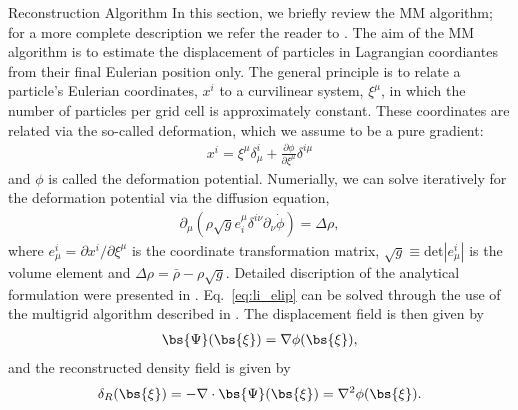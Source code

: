 \begin{section}{Reconstruction Algorithm}
  \label{sec:reconstruction}
  In this section, we briefly review the MM algorithm; for a more
  complete description we refer the reader to \cite{bib:ZhuH2016}.  
  The aim of the MM algorithm is to estimate the displacement of particles in 
  Lagrangian coordiantes from their final Eulerian position only. The
  general principle is to relate a particle's Eulerian coordinates, $x^i$ to
  a curvilinear system, $\xi^\mu$, in which the number of particles
  per grid cell is approximately constant.  These coordinates are
  related via the so-called deformation, which we assume to be a pure
  gradient:
  \begin{align}
    x^i = \xi^\mu \delta^i_\mu + \frac{\partial \phi}{\partial
    \xi^\mu}\delta^{i\mu}
  \end{align}
  and $\phi$ is called the deformation potential.  Numerially, we 
  can solve iteratively for
  the deformation potential via the diffusion equation, 
  \begin{align}
    \label{eq:li_elip}
    \partial _\mu (\rho \sqrt{g} e^\mu _i \delta^{i\nu}
    \partial_\nu \dot{\phi})=\Delta \rho,
  \end{align}
  where $e^i_\mu = \partial x^i / \partial \xi ^ \mu$ is the
  coordinate transformation matrix,
  $\sqrt{g} \equiv \mathrm{det}\left| e^i_\mu\right|$ is the volume
  element and $\Delta \rho = \bar{\rho}-\rho \sqrt{g}$. Detailed discription 
  of the analytical formulation were presented in \cite{bib:Pen1995,bib:Pen1998}.
  Eq.~\ref{eq:li_elip} can be solved through the use of the multigrid
  algorithm described in \cite{bib:Pen1995,bib:Pen1998,bib:ZhuH2016}.
  The displacement field is then given by
  \begin{align}
   \label{eq:disp}
   \bs{\Psi}(\bs{\xi})=\nabla \phi(\bs{\xi}),
  \end{align}
  and the reconstructed density field is given by
  \begin{align}
   \label{eq:delta}
   \delta_R(\bs{\xi})=- \nabla \cdot \bs{\Psi}(\bs{\xi}) = \nabla^2 \phi(\bs{\xi}). 
  \end{align}

\end{section}


